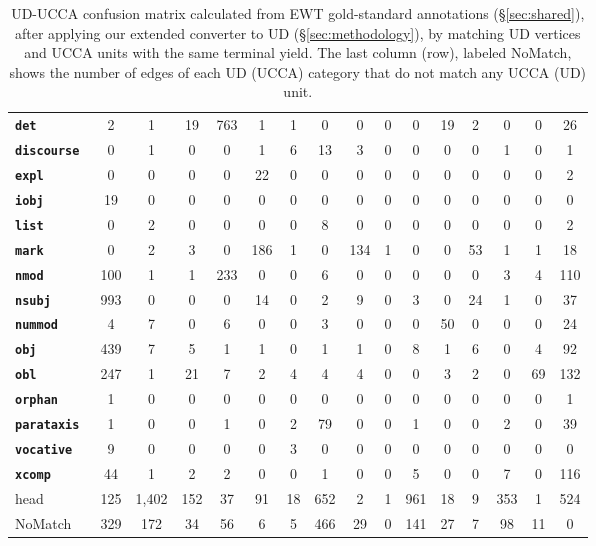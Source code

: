 \documentclass[11pt,a4paper]{article}
\begin{document}
\begin{table}[t]
\begin{tabular}{l|cccccccccccccc|c}
\bf \tt \tiny det & 2 & 1 & 19 & 763 & 1 & 1 & 0 & 0 & 0 & 0 & 19 & 2 & 0 & 0 & 26 \\
\bf \tt \tiny discourse & 0 & 1 & 0 & 0 & 1 & 6 & 13 & 3 & 0 & 0 & 0 & 0 & 1 & 0 & 1 \\
\bf \tt \tiny expl & 0 & 0 & 0 & 0 & 22 & 0 & 0 & 0 & 0 & 0 & 0 & 0 & 0 & 0 & 2 \\
\bf \tt \tiny iobj & 19 & 0 & 0 & 0 & 0 & 0 & 0 & 0 & 0 & 0 & 0 & 0 & 0 & 0 & 0 \\
\bf \tt \tiny list & 0 & 2 & 0 & 0 & 0 & 0 & 8 & 0 & 0 & 0 & 0 & 0 & 0 & 0 & 2 \\
\bf \tt \tiny mark & 0 & 2 & 3 & 0 & 186 & 1 & 0 & 134 & 1 & 0 & 0 & 53 & 1 & 1 & 18 \\
\bf \tt \tiny nmod & 100 & 1 & 1 & 233 & 0 & 0 & 6 & 0 & 0 & 0 & 0 & 0 & 3 & 4 & 110 \\
\bf \tt \tiny nsubj & 993 & 0 & 0 & 0 & 14 & 0 & 2 & 9 & 0 & 3 & 0 & 24 & 1 & 0 & 37 \\
\bf \tt \tiny nummod & 4 & 7 & 0 & 6 & 0 & 0 & 3 & 0 & 0 & 0 & 50 & 0 & 0 & 0 & 24 \\
\bf \tt \tiny obj & 439 & 7 & 5 & 1 & 1 & 0 & 1 & 1 & 0 & 8 & 1 & 6 & 0 & 4 & 92 \\
\bf \tt \tiny obl & 247 & 1 & 21 & 7 & 2 & 4 & 4 & 4 & 0 & 0 & 3 & 2 & 0 & 69 & 132 \\
\bf \tt \tiny orphan & 1 & 0 & 0 & 0 & 0 & 0 & 0 & 0 & 0 & 0 & 0 & 0 & 0 & 0 & 1 \\
\bf \tt \tiny parataxis & 1 & 0 & 0 & 1 & 0 & 2 & 79 & 0 & 0 & 1 & 0 & 0 & 2 & 0 & 39 \\
\bf \tt \tiny vocative & 9 & 0 & 0 & 0 & 0 & 3 & 0 & 0 & 0 & 0 & 0 & 0 & 0 & 0 & 0 \\
\bf \tt \tiny xcomp & 44 & 1 & 2 & 2 & 0 & 0 & 1 & 0 & 0 & 5 & 0 & 0 & 7 & 0 & 116 \\
\hline
head & 125 & 1,402 & 152 & 37 & 91 & 18 & 652 & 2 & 1 & 961 & 18 & 9 & 353 & 1 & 524 \\
\sc NoMatch & 329 & 172 & 34 & 56 & 6 & 5 & 466 & 29 & 0 & 141 & 27 & 7 & 98 & 11 & 0
\end{tabular}
\caption{UD-UCCA confusion matrix calculated from EWT
gold-standard annotations (\S\ref{sec:shared}),
after applying our extended converter to UD (\S\ref{sec:methodology}),
by matching UD vertices and UCCA units with the same terminal yield.
The last column (row), labeled {\sc NoMatch}, shows the number of edges of each UD (UCCA) category
that do not match any UCCA (UD) unit.
\label{tab:confusion_matrix}}
\end{table}
\end{document}
